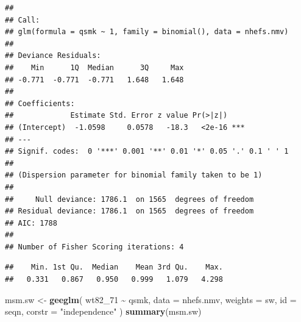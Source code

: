 \documentclass[
  10pt,
]{book}
\newenvironment{Shaded}{\begin{snugshade}}{\end{snugshade}}
\newcommand{\DataTypeTok}[1]{\textcolor[rgb]{0.13,0.29,0.53}{#1}}
\newcommand{\DecValTok}[1]{\textcolor[rgb]{0.00,0.00,0.81}{#1}}
\newcommand{\KeywordTok}[1]{\textcolor[rgb]{0.13,0.29,0.53}{\textbf{#1}}}
\newcommand{\NormalTok}[1]{#1}
\newcommand{\OperatorTok}[1]{\textcolor[rgb]{0.81,0.36,0.00}{\textbf{#1}}}
\newcommand{\StringTok}[1]{\textcolor[rgb]{0.31,0.60,0.02}{#1}}
\begin{document}
\begin{verbatim}
## 
## Call:
## glm(formula = qsmk ~ 1, family = binomial(), data = nhefs.nmv)
## 
## Deviance Residuals: 
##    Min      1Q  Median      3Q     Max  
## -0.771  -0.771  -0.771   1.648   1.648  
## 
## Coefficients:
##             Estimate Std. Error z value Pr(>|z|)    
## (Intercept)  -1.0598     0.0578   -18.3   <2e-16 ***
## ---
## Signif. codes:  0 '***' 0.001 '**' 0.01 '*' 0.05 '.' 0.1 ' ' 1
## 
## (Dispersion parameter for binomial family taken to be 1)
## 
##     Null deviance: 1786.1  on 1565  degrees of freedom
## Residual deviance: 1786.1  on 1565  degrees of freedom
## AIC: 1788
## 
## Number of Fisher Scoring iterations: 4
\end{verbatim}

\begin{Shaded}
\end{Shaded}

\begin{verbatim}
##    Min. 1st Qu.  Median    Mean 3rd Qu.    Max. 
##   0.331   0.867   0.950   0.999   1.079   4.298
\end{verbatim}

\begin{Shaded}
\begin{Highlighting}[]
\NormalTok{msm.sw \textless{}{-}}\StringTok{ }\KeywordTok{geeglm}\NormalTok{(}
\NormalTok{  wt82\_}\DecValTok{71} \OperatorTok{\textasciitilde{}}\StringTok{ }\NormalTok{qsmk,}
  \DataTypeTok{data =}\NormalTok{ nhefs.nmv,}
  \DataTypeTok{weights =}\NormalTok{ sw,}
  \DataTypeTok{id =}\NormalTok{ seqn,}
  \DataTypeTok{corstr =} \StringTok{"independence"}
\NormalTok{)}
\KeywordTok{summary}\NormalTok{(msm.sw)}
\end{Highlighting}
\end{Shaded}
\end{document}
